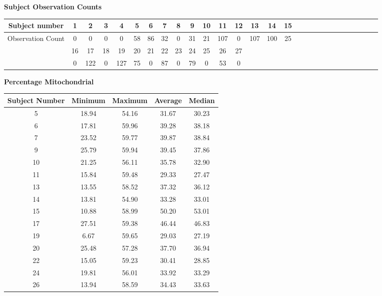 \documentclass{article}
\begin{document}
\textbf{\large{Subject Observation Counts}}

\vspace{5pt}

\begin{tabular}{|c|c|c|c|c|c|c|c|c|c|c|c|c|c|c|c|c|c|c|c|c|c|c|c|c|c|c|c|}
\hline
Subject number & 1 & 2 & 3 & 4 & 5 & 6 & 7 & 8 & 9 & 10 & 11 & 12 & 13 & 14 & 15 \\
\hline
Observation Count & 0 & 0 & 0 & 0 & 58 & 86 & 32 & 0 & 31 & 21 & 107 & 0 & 107 & 100 & 25 \\
\hline
\hline
  & 16 & 17 & 18 & 19 & 20 & 21 & 22 & 23 & 24 & 25 & 26 & 27 & & &\\
\hline
 & 0 & 122 & 0 & 127 & 75 & 0 & 87 & 0 & 79 & 0 & 53 & 0 & & &\\
\hline
\end{tabular}

\vspace{25pt}


\textbf{\large{Percentage Mitochondrial}}

\vspace{5pt}

\begin{tabular}{|c|c|c|c|c|}
\hline
Subject Number & Minimum & Maximum & Average & Median \\
\hline
5 & 18.94 & 54.16 & 31.67 & 30.23 \\
\hline
6 & 17.81 & 59.96 & 39.28 & 38.18 \\
\hline
7 & 23.52 & 59.77 & 39.87 & 38.84 \\
\hline
9 & 25.79 & 59.94 & 39.45 & 37.86 \\
\hline
10 & 21.25 & 56.11 & 35.78 & 32.90 \\
\hline
11 & 15.84 & 59.48 & 29.33 & 27.47 \\
\hline
13 & 13.55 & 58.52 & 37.32 & 36.12 \\
\hline
14 & 13.81 & 54.90 & 33.28 & 33.01 \\
\hline
15 & 10.88 & 58.99 & 50.20 & 53.01 \\
\hline
17 & 27.51 & 59.38 & 46.44 & 46.83 \\
\hline
19 & 6.67 & 59.65 & 29.03 & 27.19 \\
\hline
20 & 25.48 & 57.28 & 37.70 & 36.94 \\
\hline
22 & 15.05 & 59.23 & 30.41 & 28.85 \\
\hline
24 & 19.81 & 56.01 & 33.92 & 33.29 \\
\hline
26 & 13.94 & 58.59 & 34.43 & 33.63 \\
\hline
\end{tabular}
\end{document}
